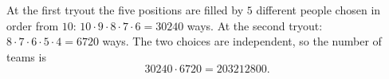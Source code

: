 At the first tryout the five positions are filled by $5$ different people chosen in order from $10$: $10\cdot9\cdot8\cdot7\cdot6=30240$ ways. At the second tryout: $8\cdot7\cdot6\cdot5\cdot4=6720$ ways. The two choices are independent, so the number of teams is
\[30240\cdot6720=\boxed{203212800}.\]
